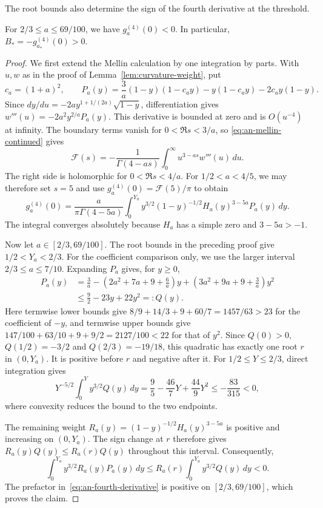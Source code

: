 The root bounds also determine the sign of the fourth derivative
at the threshold.

\begin{lemma}\label{lem:analytic-quartic}
For $2/3\le a\le69/100$, we have $g_a^{(4)}(0)<0$.
In particular, $B_*=-g_{a_*}^{(4)}(0)>0$.
\end{lemma}

\begin{proof}
We first extend the Mellin calculation by one integration by parts.
With $u,w$ as in the proof of Lemma~\ref{lem:curvature-weight}, put
\[
 c_a=(1+a)^2,\qquad
 P_a(y)=\frac3a(1-y)(1-c_ay)-y(1-c_ay)-2c_ay(1-y).
\]
Since $dy/du=-2ay^{1+1/(2a)}\sqrt{1-y}$, differentiation gives
$w'''(u)=-2a^2y^{2/a}P_a(y)$.
This derivative is bounded at zero and is $O(u^{-4})$ at infinity.
The boundary terms vanish for $0<\Re s<3/a$, so
\eqref{eq:an-mellin-continued} gives
\[
 \mathcal F(s)=-\frac1{\Gamma(4-as)}
                \int_0^\infty u^{3-as}w'''(u)\,d u.
\]
The right side is holomorphic for $0<\Re s<4/a$.
For $1/2<a<4/5$, we may therefore set $s=5$ and use
$g_a^{(4)}(0)=\mathcal F(5)/\pi$ to obtain
\begin{equation}\label{eq:an-fourth-derivative}
 g_a^{(4)}(0)=\frac{a}{\pi\Gamma(4-5a)}
 \int_0^{Y_a}y^{3/2}(1-y)^{-1/2}H_a(y)^{3-5a}P_a(y)\,d y.
\end{equation}
The integral converges absolutely because $H_a$ has a simple zero
and $3-5a>-1$.

Now let $a\in[2/3,69/100]$. The root bounds in the preceding proof
give $1/2<Y_a<2/3$. For the coefficient comparison only, we use
the larger interval $2/3\le a\le7/10$. Expanding $P_a$ gives, for $y\ge0$,
\[
 \begin{split}
 P_a(y)&=\frac3a-\left(2a^2+7a+9+\frac6a\right)y
                    +\left(3a^2+9a+9+\frac3a\right)y^2\\
       &\le\frac92-23y+22y^2=:Q(y).
 \end{split}
\]
Here termwise lower bounds give
$8/9+14/3+9+60/7=1457/63>23$ for the coefficient of $-y$,
and termwise upper bounds give
$147/100+63/10+9+9/2=2127/100<22$ for that of $y^2$.
Since $Q(0)>0$, $Q(1/2)=-3/2$ and $Q(2/3)=-19/18$,
this quadratic has exactly one root $r$ in $(0,Y_a)$.
It is positive before $r$ and negative after it.
For $1/2\le Y\le2/3$, direct integration gives
\[
 Y^{-5/2}\int_0^Y y^{3/2}Q(y)\,d y
 =\frac95-\frac{46}{7}Y+\frac{44}{9}Y^2
 \le-\frac{83}{315}<0,
\]
where convexity reduces the bound to the two endpoints.

The remaining weight $R_a(y)=(1-y)^{-1/2}H_a(y)^{3-5a}$
is positive and increasing on $(0,Y_a)$.
The sign change at $r$ therefore gives
$R_a(y)Q(y)\le R_a(r)Q(y)$ throughout this interval. Consequently,
\[
 \int_0^{Y_a}y^{3/2}R_a(y)P_a(y)\,d y
 \le R_a(r)\int_0^{Y_a}y^{3/2}Q(y)\,d y<0.
\]
The prefactor in~\eqref{eq:an-fourth-derivative} is positive on
$[2/3,69/100]$, which proves the claim.
\end{proof}

